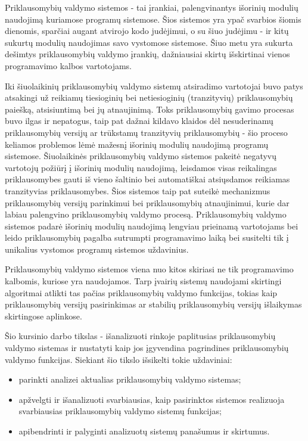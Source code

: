 
Priklausomybių valdymo sistemos - tai įrankiai, palengvinantys išorinių modulių naudojimą kuriamose programų
sistemose. Šios sistemos yra ypač svarbios šiomis dienomis, sparčiai augant atvirojo kodo judėjimui, o su šiuo
judėjimu - ir kitų sukurtų modulių naudojimas savo vystomose sistemose. Šiuo metu yra sukurta dešimtys priklausomybių
valdymo įrankių, dažniausiai skirtų išskirtinai vienos programavimo kalbos vartotojams.

Iki šiuolaikinių priklausomybių valdymo sistemų atsiradimo vartotojai buvo patys
atsakingi už reikiamų tiesioginių bei netiesioginių (tranzityvių) priklausomybių paiešką, atsisiuntimą bei jų atnaujinimą. Toks priklausomybių
gavimo procesas buvo ilgas ir nepatogus, taip pat dažnai kildavo klaidos dėl nesuderinamų priklausomybių versijų ar trūkstamų tranzityvių
priklausomybių - šio proceso keliamos problemos lėmė mažesnį išorinių modulių naudojimą programų sistemose. Šiuolaikinės priklausomybių
valdymo sistemos pakeitė negatyvų vartotojų požiūrį į išorinių modulių naudojimą, leisdamos visas reikalingas priklausomybes gauti iš vieno
šaltinio bei automatiškai atsiųsdamos reikiamas tranzityvias priklausomybes. Šios sistemos taip pat suteikė mechanizmus priklausomybių versijų
parinkimui bei priklausomybių atnaujinimui, kurie dar labiau palengvino priklausomybių valdymo procesą. Priklausomybių valdymo sistemos padarė
išorinių modulių naudojimą lengviau prieinamą vartotojams bei leido priklausomybių pagalba sutrumpti programavimo laiką bei susitelti tik
į unikalius vystomos programų sistemos uždavinius.

Priklausomybių valdymo sistemos viena nuo kitos skiriasi ne tik programavimo kalbomis, kuriose yra naudojamos. Tarp
įvairių sistemų naudojami skirtingi algoritmai atlikti tas pačias priklausomybių valdymo funkcijas, tokias kaip
priklausomybių versijų pasirinkimas ar stabilių priklausomybių versijų išlaikymas skirtingose aplinkose.

Šio kursinio darbo tikslas - išanalizuoti rinkoje paplitusias priklausomybių valdymo sistemas ir nustatyti kaip jos įgyvendina pagrindines
priklausomybių valdymo funkcijas. Siekiant šio tikslo išsikelti tokie uždaviniai:
\begin{itemize}
    \item parinkti analizei aktualias priklausomybių valdymo sistemas;
    \item apžvelgti ir išanalizuoti svarbiausias, kaip pasirinktos sistemos realizuoja svarbiausias priklausomybių valdymo sistemų funkcijas;
    \item apibendrinti ir palyginti analizuotų sistemų panašumus ir skirtumus.
\end{itemize}
